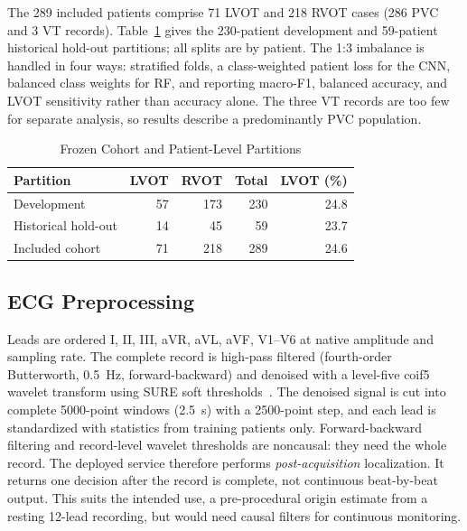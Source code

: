 \documentclass[conference,a4paper]{IEEEtran}
\begin{document}
The 289 included patients comprise 71 LVOT and 218 RVOT cases (286 PVC and 3 VT records). Table~\ref{tab:cohort} gives the 230-patient development and 59-patient historical hold-out partitions; all splits are by patient. The 1:3 imbalance is handled in four ways: stratified folds, a class-weighted patient loss for the CNN, balanced class weights for RF, and reporting macro-F1, balanced accuracy, and LVOT sensitivity rather than accuracy alone. The three VT records are too few for separate analysis, so results describe a predominantly PVC population.

\begin{table}[t]
\caption{Frozen Cohort and Patient-Level Partitions}
\label{tab:cohort}\centering\footnotesize
\renewcommand{\arraystretch}{1.15}
\begin{tabular}{@{}lrrrr@{}}\toprule
Partition & LVOT & RVOT & Total & LVOT (\%)\\\midrule
Development & 57 & 173 & 230 & 24.8\\
Historical hold-out & 14 & 45 & 59 & 23.7\\\midrule
Included cohort & 71 & 218 & 289 & 24.6\\\bottomrule
\end{tabular}
\end{table}

\subsection{ECG Preprocessing}
Leads are ordered I, II, III, aVR, aVL, aVF, V1--V6 at native amplitude and sampling rate. The complete record is high-pass filtered (fourth-order Butterworth, 0.5~Hz, forward-backward) and denoised with a level-five coif5 wavelet transform using SURE soft thresholds~\cite{donoho1995}. The denoised signal is cut into complete 5000-point windows (2.5~s) with a 2500-point step, and each lead is standardized with statistics from training patients only. Forward-backward filtering and record-level wavelet thresholds are noncausal: they need the whole record. The deployed service therefore performs \emph{post-acquisition} localization. It returns one decision after the record is complete, not continuous beat-by-beat output. This suits the intended use, a pre-procedural origin estimate from a resting 12-lead recording, but would need causal filters for continuous monitoring.
\end{document}

